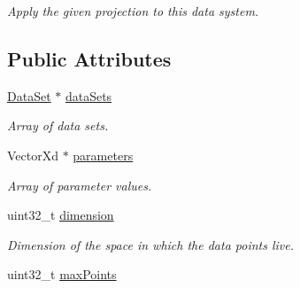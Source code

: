 \begin{DoxyCompactItemize}
\begin{DoxyCompactList}\small\item\em Apply the given projection to this data system. \end{DoxyCompactList}\end{DoxyCompactItemize}
\subsection*{Public Attributes}
\begin{DoxyCompactItemize}
\item 
\hypertarget{struct_d_r_d_s_p_1_1_data_system_a67957644fe1a286de4d9ad2dec06b972}{\hyperlink{struct_d_r_d_s_p_1_1_data_set}{Data\-Set} $\ast$ \hyperlink{struct_d_r_d_s_p_1_1_data_system_a67957644fe1a286de4d9ad2dec06b972}{data\-Sets}}\label{struct_d_r_d_s_p_1_1_data_system_a67957644fe1a286de4d9ad2dec06b972}

\begin{DoxyCompactList}\small\item\em Array of data sets. \end{DoxyCompactList}\item 
\hypertarget{struct_d_r_d_s_p_1_1_data_system_adfbfe0987e15a40aa9a39987937ca337}{Vector\-Xd $\ast$ \hyperlink{struct_d_r_d_s_p_1_1_data_system_adfbfe0987e15a40aa9a39987937ca337}{parameters}}\label{struct_d_r_d_s_p_1_1_data_system_adfbfe0987e15a40aa9a39987937ca337}

\begin{DoxyCompactList}\small\item\em Array of parameter values. \end{DoxyCompactList}\item 
\hypertarget{struct_d_r_d_s_p_1_1_data_system_ab6aefaa08cd0a5b6a9e83105ecd56289}{uint32\-\_\-t \hyperlink{struct_d_r_d_s_p_1_1_data_system_ab6aefaa08cd0a5b6a9e83105ecd56289}{dimension}}\label{struct_d_r_d_s_p_1_1_data_system_ab6aefaa08cd0a5b6a9e83105ecd56289}

\begin{DoxyCompactList}\small\item\em Dimension of the space in which the data points live. \end{DoxyCompactList}\item 
\hypertarget{struct_d_r_d_s_p_1_1_data_system_a3e5fe0e180799a6251dfd66b4a2cd49c}{uint32\-\_\-t \hyperlink{struct_d_r_d_s_p_1_1_data_system_a3e5fe0e180799a6251dfd66b4a2cd49c}{max\-Points}}\label{struct_d_r_d_s_p_1_1_data_system_a3e5fe0e180799a6251dfd66b4a2cd49c}


\end{DoxyCompactItemize}
